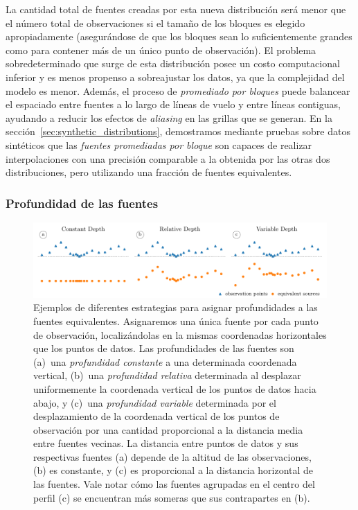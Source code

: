 La cantidad total de fuentes creadas por esta nueva distribución será menor que
el número total de observaciones si el tamaño de los bloques es elegido
apropiadamente (asegurándose de que los bloques sean lo suficientemente grandes
como para contener más de un único punto de observación).
El problema sobredeterminado que surge de esta distribución posee un costo
computacional inferior y es menos propenso a sobreajustar los datos, ya que la
complejidad del modelo es menor.
Además, el proceso de \emph{promediado por bloques} puede balancear el
espaciado entre fuentes a lo largo de líneas de vuelo y entre líneas contiguas,
ayudando a reducir los efectos de \emph{aliasing} en las grillas que se generan.
En la sección~\ref{sec:synthetic_distributions}, demostramos mediante pruebas
sobre datos sintéticos que las \emph{fuentes promediadas por bloque} son
capaces de realizar interpolaciones con una precisión comparable a la obtenida
por las otras dos distribuciones, pero utilizando una fracción de fuentes
equivalentes.


\subsubsection{Profundidad de las fuentes}

\begin{figure}[tb]
    \includegraphics[width=\linewidth]{figs/eql-gradient-boosted/depth_types.pdf}
    \caption{
        Ejemplos de diferentes estrategias para asignar profundidades a las
        fuentes equivalentes.
        Asignaremos una única fuente por cada punto de observación,
        localizándolas en la mismas coordenadas horizontales que los puntos de
        datos.
        Las profundidades de las fuentes son
        (a)~una \emph{profundidad constante} a una determinada coordenada
        vertical,
        (b)~una \emph{profundidad relativa} determinada al desplazar
        uniformemente la coordenada vertical de los puntos de datos hacia
        abajo, y
        (c)~una \emph{profundidad variable} determinada por el desplazamiento
        de la coordenada vertical de los puntos de observación por una cantidad
        proporcional a la distancia media entre fuentes vecinas.
        La distancia entre puntos de datos y sus respectivas fuentes (a)
        depende de la altitud de las observaciones, (b) es constante, y (c) es
        proporcional a la distancia horizontal de las fuentes.
        Vale notar cómo las fuentes agrupadas en el centro del perfil (c) se
        encuentran más someras que sus contrapartes en (b).
    }
    \label{fig:depth_types}
\end{figure}

